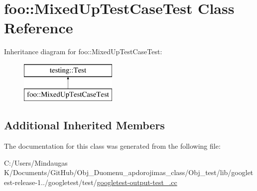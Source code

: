\hypertarget{classfoo_1_1_mixed_up_test_case_test}{}\section{foo\+::Mixed\+Up\+Test\+Case\+Test Class Reference}
\label{classfoo_1_1_mixed_up_test_case_test}
Inheritance diagram for foo\+::Mixed\+Up\+Test\+Case\+Test\+:\begin{figure}[H]
\begin{center}
\leavevmode
\includegraphics[height=2.000000cm]{df/d46/classfoo_1_1_mixed_up_test_case_test}
\end{center}
\end{figure}
\subsection*{Additional Inherited Members}


The documentation for this class was generated from the following file\+:\begin{DoxyCompactItemize}
\item 
C\+:/\+Users/\+Mindaugas K/\+Documents/\+Git\+Hub/\+Obj\+\_\+\+Duomenu\+\_\+apdorojimas\+\_\+class/\+Obj\+\_\+test/lib/googletest-\/release-\/1../googletest/test/\mbox{\hyperlink{_obj__test_2lib_2googletest-release-1_88_81_2googletest_2test_2googletest-output-test___8cc}{googletest-\/output-\/test\+\_\+.\+cc}}\end{DoxyCompactItemize}
